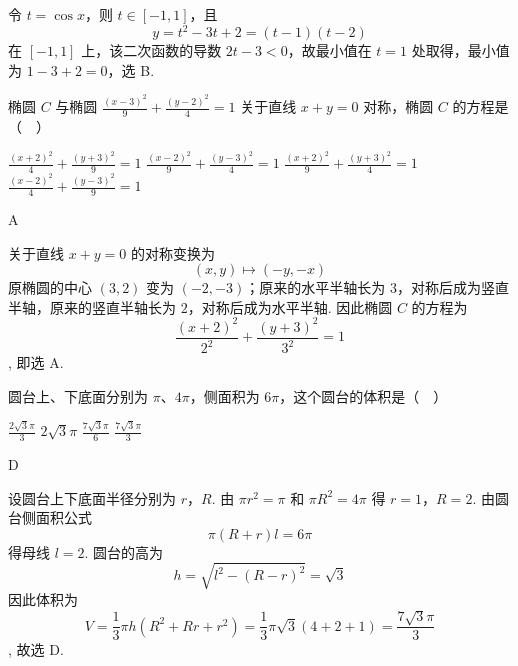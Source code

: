 \begin{solution}
令 \(t=\cos x\)，则 \(t\in[-1,1]\)，且
\[
y=t^2-3t+2=(t-1)(t-2)
\]
在 \([-1,1]\) 上，该二次函数的导数 \(2t-3<0\)，故最小值在 \(t=1\) 处取得，最小值为 \(1-3+2=0\)，选 B.
\end{solution}

\begin{problem}
椭圆 \(C\) 与椭圆 \(\frac{(x - 3)^2}{9} + \frac{(y - 2)^2}{4} = 1\) 关于直线 \(x + y = 0\) 对称，椭圆 \(C\) 的方程是（\(\quad\)）

\choices
    {\(\frac{(x + 2)^2}{4} +\frac{(y + 3)^2}{9} = 1\)}
    {\(\frac{(x - 2)^2}{9} +\frac{(y - 3)^2}{4} = 1\)}
    {\(\frac{(x + 2)^2}{9} +\frac{(y + 3)^2}{4} = 1\)}
    {\(\frac{(x - 2)^2}{4} +\frac{(y - 3)^2}{9} = 1\)}

\end{problem}

\begin{answer}
A
\end{answer}

\begin{solution}
关于直线 \(x+y=0\) 的对称变换为
\[
(x,y)\longmapsto(-y,-x)
\]
原椭圆的中心 \((3,2)\) 变为 \((-2,-3)\)；原来的水平半轴长为 \(3\)，对称后成为竖直半轴，原来的竖直半轴长为 \(2\)，对称后成为水平半轴. 因此椭圆 \(C\) 的方程为
\[
\frac{(x+2)^2}{2^2}+\frac{(y+3)^2}{3^2}=1
\],
即选 A.
\end{solution}

\begin{problem}
圆台上、下底面分别为 \(\pi\)、\(4\pi\)，侧面积为 \(6\pi\)，这个圆台的体积是（\(\quad\)）

\choices
    {\(\frac{2\sqrt{3}\pi}{3}\)}
    {\(2\sqrt{3}\pi\)}
    {\(\frac{7\sqrt{3}\pi}{6}\)}
    {\(\frac{7\sqrt{3}\pi}{3}\)}

\end{problem}

\begin{answer}
D
\end{answer}

\begin{solution}
设圆台上下底面半径分别为 \(r\)，\(R\). 由 \(\pi r^2=\pi\) 和 \(\pi R^2=4\pi\) 得 \(r=1\)，\(R=2\). 由圆台侧面积公式
\[
\pi(R+r)l=6\pi
\]
得母线 \(l=2\). 圆台的高为
\[
h=\sqrt{l^2-(R-r)^2}=\sqrt3
\]
因此体积为
\[
V=\frac13\pi h(R^2+Rr+r^2)
=\frac13\pi\sqrt3(4+2+1)
=\frac{7\sqrt3\pi}{3}
\],
故选 D.
\end{solution}

